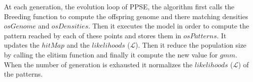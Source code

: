 \documentclass[10pt,letterpaper]{article}
\theoremstyle{definition}
\theoremstyle{remark}
\begin{document}
At each generation, the evolution loop of PPSE, the algorithm first calls the Breeding function to compute the offspring genome and there matching densities $osGenome$ and $osDensities$. 
Then it executes the model in order to compute the pattern reached by each of these points and stores them in $osPatterns$. 
It updates the $hitMap$ and the $likelihoods$ ($\mathcal{L}$). Then it reduce the population size by calling the elitism function and finally it compute the new value for $gmm$. 
When the number of generation is exhausted it normalizes the $likelihoods$ ($\mathcal{L}$) of the patterns.









\end{document}
